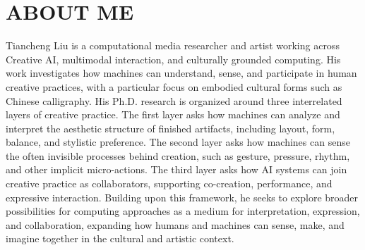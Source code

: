 \section*{ABOUT ME}
Tiancheng Liu is a computational media researcher and artist working across Creative AI, multimodal interaction, and culturally grounded computing. His work investigates how machines can understand, sense, and participate in human creative practices, with a particular focus on embodied cultural forms such as Chinese calligraphy.
His Ph.D. research is organized around three interrelated layers of creative practice. The first layer asks how machines can analyze and interpret the aesthetic structure of finished artifacts, including layout, form, balance, and stylistic preference. The second layer asks how machines can sense the often invisible processes behind creation, such as gesture, pressure, rhythm, and other implicit micro-actions. The third layer asks how AI systems can join creative practice as collaborators, supporting co-creation, performance, and expressive interaction.
Building upon this framework, he seeks to explore broader possibilities for computing approaches as a medium for interpretation, expression, and collaboration, expanding how humans and machines can sense, make, and imagine together in the cultural and artistic context.
